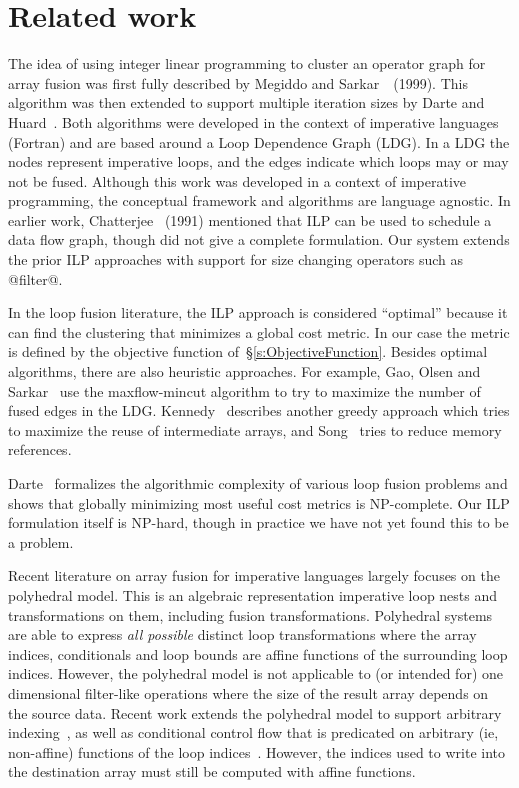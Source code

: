 \section{Related work}
The idea of using integer linear programming to cluster an operator graph for array fusion was first fully described by Megiddo and Sarkar~\cite{megiddo1998optimal}~(1999). This algorithm was then extended to support multiple iteration sizes by Darte and Huard~\cite{darte2002contraction}. Both algorithms were developed in the context of imperative languages (Fortran) and are based around a Loop Dependence Graph (LDG). In a LDG the nodes represent imperative loops, and the edges indicate which loops may or may not be fused. Although this work was developed in a context of imperative programming, the conceptual framework and algorithms are language agnostic. In earlier work, Chatterjee~\cite{chatterjee1993nested} (1991) mentioned that ILP can be used to schedule a data flow graph, though did not give a complete formulation. Our system extends the prior ILP approaches with support for size changing operators such as @filter@.

In the loop fusion literature, the ILP approach is considered ``optimal'' because it can find the clustering that minimizes a global cost metric. In our case the metric is defined by the objective function of~\S\ref{s:ObjectiveFunction}. Besides optimal algorithms, there are also heuristic approaches. For example, Gao, Olsen and Sarkar~\cite{gao1993collective} use the maxflow-mincut algorithm to try to maximize the number of fused edges in the LDG.  Kennedy~\cite{kennedy2001fastgreedy} describes another greedy approach which tries to maximize the reuse of intermediate arrays, and Song~\cite{song2004improving} tries to reduce memory references.

Darte~\cite{darte1999complexity} formalizes the algorithmic complexity of various loop fusion problems and shows that globally minimizing most useful cost metrics is NP-complete. Our ILP formulation itself is NP-hard, though in practice we have not yet found this to be a problem.

Recent literature on array fusion for imperative languages largely focuses on the polyhedral model. This is an algebraic representation imperative loop nests and transformations on them, including fusion transformations. Polyhedral systems \cite{pouchet2011polyhedral} are able to express \emph{all possible} distinct loop transformations where the array indices, conditionals and loop bounds are affine functions of the surrounding loop indices. However, the polyhedral model is not applicable to (or intended for) one dimensional filter-like operations where the size of the result array depends on the source data. Recent work extends the polyhedral model to support arbitrary indexing~\cite{venkat2014polyhedral}, as well as conditional control flow that is predicated on arbitrary (ie, non-affine) functions of the loop indices~\cite{benabderrahmane2010polyhedral}. However, the indices used to write into the destination array must still be computed with affine functions. 

